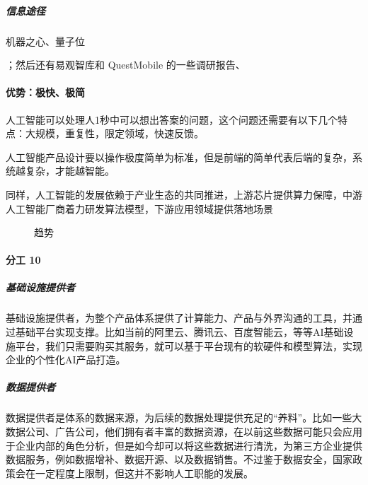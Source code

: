 \documentclass[letterpaper,11pt,english]{sphinxmanual}
\begin{document}
\subparagraph{信息途径}
\label{\detokenize{chapter_project/AI_industry_analysis:id8}}
机器之心、量子位
%
\begin{footnote}[645]\sphinxAtStartFootnote
{}
%
\end{footnote}；然后还有易观智库和
QuestMobile 的一些调研报告、


\paragraph{优势：极快、极简}
\label{\detokenize{chapter_project/AI_industry_analysis:id9}}
人工智能可以处理人1秒中可以想出答案的问题，这个问题还需要有以下几个特点：大规模，重复性，限定领域，快速反馈。

人工智能产品设计要以操作极度简单为标准，但是前端的简单代表后端的复杂，系统越复杂，才能越智能。

同样，人工智能的发展依赖于产业生态的共同推进，上游芯片提供算力保障，中游人工智能厂商着力研发算法模型，下游应用领域提供落地场景

\begin{figure}[H]
\centering
\capstart

\noindent{}
\caption{趋势}\label{\detokenize{chapter_project/AI_industry_analysis:id30}}\end{figure}


\paragraph{分工 10\sphinxfootnotemark[646]}
\label{\detokenize{chapter_project/AI_industry_analysis:id10}}%
\begin{footnotetext}[646]\sphinxAtStartFootnote
{}
%
\end{footnotetext}\ignorespaces 

\subparagraph{基础设施提供者}
\label{\detokenize{chapter_project/AI_industry_analysis:id11}}
基础设施提供者，为整个产品体系提供了计算能力、产品与外界沟通的工具，并通过基础平台实现支撑。比如当前的阿里云、腾讯云、百度智能云，等等AI基础设施平台，我们只需要购买其服务，就可以基于平台现有的软硬件和模型算法，实现企业的个性化AI产品打造。


\subparagraph{数据提供者}
\label{\detokenize{chapter_project/AI_industry_analysis:id12}}
数据提供者是体系的数据来源，为后续的数据处理提供充足的“养料”。比如一些大数据公司、广告公司，他们拥有者丰富的数据资源，在以前这些数据可能只会应用于企业内部的角色分析，但是如今却可以将这些数据进行清洗，为第三方企业提供数据服务，例如数据增补、数据开源、以及数据销售。不过鉴于数据安全，国家政策会在一定程度上限制，但这并不影响人工职能的发展。
\end{document}
